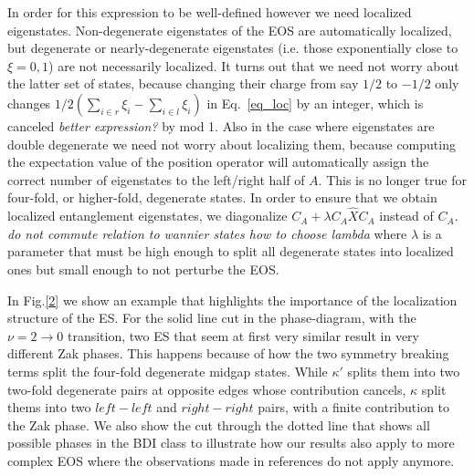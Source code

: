 \documentclass[twocolumn,amsmath,longbibliography,amssymb,superscriptaddress]{revtex4-1}
\newcommand{\carlos}[1]{{\color{red} #1}}
\newcommand{\mariac}[1]{{\it\color{cyan}#1}}
\begin{document}
In order for this expression to be well-defined however we need localized eigenstates. 
Non-degenerate eigenstates of the EOS are automatically localized, but degenerate or nearly-degenerate eigenstates (i.e. those exponentially close to $\xi=0,1$) are not necessarily localized. 
It turns out that we need not worry about the latter set of states, because changing their charge from say $1/2$ to $-1/2$ only changes $1/2(\sum_{i\in r} \xi_i - \sum_{i\in l}\xi_i)$ in Eq.~\eqref{eq_loc} by an integer, which is canceled \mariac{better expression?} by mod 1. 
Also in the case where eigenstates are double degenerate we need not worry about localizing them, because computing the expectation value of the position operator will automatically assign the correct number of eigenstates to the left/right half of $A$. 
This is no longer true for four-fold, or higher-fold, degenerate states.
In order to ensure that we obtain localized entanglement eigenstates,  we diagonalize $C_A + \lambda C_A\hat{X}C_A$ instead of $C_A$. 
\mariac{do not commute 
relation to wannier states
how to choose lambda }
where $\lambda$ is a parameter that must be high enough to split all degenerate states into localized ones but small enough to not perturbe the EOS. 

In Fig.\ref{2} we show an example that highlights the importance of the localization structure of the ES. For the solid line cut in the phase-diagram, with the $\nu = 2 \rightarrow 0 $ transition, two ES that seem at first very similar result in very different Zak phases. This happens because of how the two symmetry breaking terms split the four-fold degenerate midgap states. While $\kappa'$ splits them into two two-fold degenerate pairs at opposite edges whose contribution cancels, $\kappa$ split thems into two $left-left$ and $right-right$ pairs, with a finite contribution to the Zak phase. We also show the cut through the dotted line that shows all possible phases in the BDI class to illustrate how our results also apply to more complex EOS where the observations made in references \cite{Huang2012,Huang2012-2} do not apply anymore. 
\end{document}
